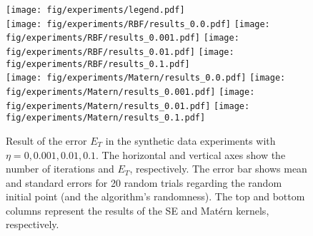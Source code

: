 \begin{figure*}[t]
    \centering
    \texttt{[image: fig/experiments/legend.pdf]}\\
    \texttt{[image: fig/experiments/RBF/results\_0.0.pdf]}
    \texttt{[image: fig/experiments/RBF/results\_0.001.pdf]}
    \texttt{[image: fig/experiments/RBF/results\_0.01.pdf]}
    \texttt{[image: fig/experiments/RBF/results\_0.1.pdf]}\\
    \texttt{[image: fig/experiments/Matern/results\_0.0.pdf]}
    \texttt{[image: fig/experiments/Matern/results\_0.001.pdf]}
    \texttt{[image: fig/experiments/Matern/results\_0.01.pdf]}
    \texttt{[image: fig/experiments/Matern/results\_0.1.pdf]}
    \caption{
        Result of the error $E_T$ in the synthetic data experiments with $\eta=0, 0.001, 0.01, 0.1$.
        The horizontal and vertical axes show the number of iterations and $E_T$, respectively.
        The error bar shows mean and standard errors for 20 random trials regarding the random initial point (and the algorithm's randomness).
        The top and bottom columns represent the results of the SE and Mat\'ern kernels, respectively.
    }
    \label{fig:syn_results}
\end{figure*}


